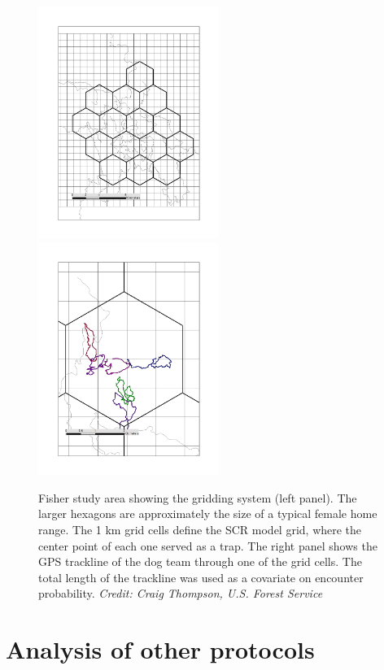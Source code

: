 \begin{figure}
\centering
\includegraphics[width=2.3in]{Ch15-searchencounter/figs/fisher_map.jpg} 
\includegraphics[width=2.3in]{Ch15-searchencounter/figs/fisher_tracklog.jpg} 
\caption{
Fisher study area showing the gridding system (left panel). The larger
hexagons are approximately the size of a typical female home
range. The 1 km grid cells define the SCR model grid, where the center
point of each one served as a trap. The right panel shows the GPS
trackline of the dog team through one of the grid cells. The total
length of the trackline was used as a covariate on encounter probability.
{\it Credit: Craig Thompson, U.S. Forest Service}
}
\label{searchencounter.fig.fisherstudy}
\end{figure}



\section{Analysis of other protocols}


